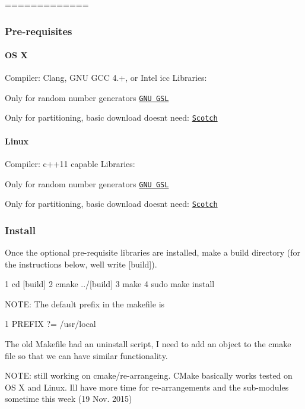============= \subsubsection*{Pre-\/requisites}

\paragraph*{O\+S X}

Compiler\+: Clang, G\+N\+U G\+C\+C 4.+, or Intel icc Libraries\+:
\begin{DoxyItemize}
\item Only for random number generators \href{http://goo.gl/gchdSw}{\tt G\+N\+U G\+S\+L}
\item Only for partitioning, basic download doesn\textquotesingle{}t need\+: \href{http://goo.gl/tI1NGf}{\tt Scotch} \paragraph*{Linux}
\end{DoxyItemize}

Compiler\+: c++11 capable Libraries\+:
\begin{DoxyItemize}
\item Only for random number generators \href{http://goo.gl/gchdSw}{\tt G\+N\+U G\+S\+L}
\item Only for partitioning, basic download doesn\textquotesingle{}t need\+: \href{http://goo.gl/tI1NGf}{\tt Scotch}
\end{DoxyItemize}

\subsubsection*{Install}

Once the optional pre-\/requisite libraries are installed, make a build directory (for the instructions below, we\textquotesingle{}ll write \mbox{[}build\mbox{]}). 
\begin{DoxyCode}
1 cd [build]
2 cmake ../[build]
3 make
4 sudo make install
\end{DoxyCode}
 N\+O\+T\+E\+: The default prefix in the makefile is 
\begin{DoxyCode}
1 PREFIX ?= /usr/local
\end{DoxyCode}
 The old Makefile had an uninstall script, I need to add an object to the cmake file so that we can have similar functionality.

N\+O\+T\+E\+: still working on cmake/re-\/arrangeing. C\+Make basically works tested on O\+S X and Linux. I\textquotesingle{}ll have more time for re-\/arrangements and the sub-\/modules sometime this week (19 Nov. 2015) 